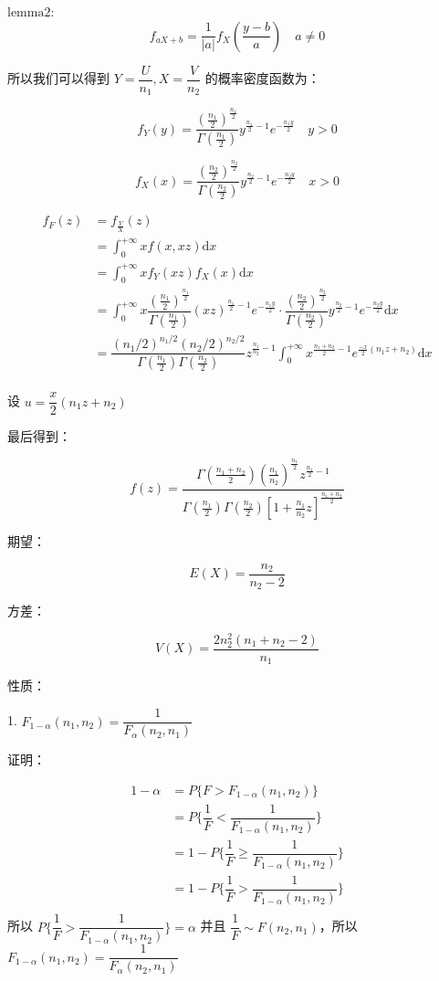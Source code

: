 \documentclass[12pt, a4paper, oneside]{ctexbook}
\begin{document}
$\text{lemma2}:$
$$
f_{aX + b} = \dfrac{1}{|a|}f_X(\dfrac{y - b}{a}) \quad a \neq 0
$$

所以我们可以得到 $Y = \dfrac{U}{n_1}, X = \dfrac{V}{n_2}$ 的概率密度函数为：

$$
f_Y(y) = \dfrac{(\frac{n_1}{2})^{\frac{n_1}{2}}}{\Gamma(\frac{n_1}{2})}y^{\frac{n_1}{2} - 1}e^{-\frac{n_1y}{2}} \quad y > 0
$$

$$
f_X(x) = \dfrac{(\frac{n_2}{2})^{\frac{n_2}{2}}}{\Gamma(\frac{n_2}{2})}y^{\frac{n_2}{2} - 1}e^{-\frac{n_2y}{2}} \quad x > 0
$$

$$
\begin{aligned}
f_F(z) &= f_{\frac{Y}{X}}(z) \\
&= \int_0^{+\infty} xf(x, xz) \mathrm{d}x \\
&= \int_0^{+\infty} xf_Y(xz)f_X(x) \mathrm{d}x \\
&= \int_0^{+\infty} x \dfrac{(\frac{n_1}{2})^{\frac{n_1}{2}}}{\Gamma(\frac{n_1}{2})}(xz)^{\frac{n_1}{2} - 1}e^{-\frac{n_1y}{2}} \cdot  \dfrac{(\frac{n_2}{2})^{\frac{n_2}{2}}}{\Gamma(\frac{n_2}{2})}y^{\frac{n_2}{2} - 1}e^{-\frac{n_2y}{2}} \mathrm{d}x \\
&= \dfrac{(n_1 / 2)^{n_1 / 2}(n_2 / 2)^{n_2 / 2}}{\Gamma(\frac{n_1}{2}) \Gamma(\frac{n_2}{2})}z^{\frac{n_1}{n_2} - 1}\int_0^{+\infty}x^{\frac{n_1 + n_2}{2} - 1}e^{\frac{-x}{2}(n_1z + n_2)} \mathrm{d}x \\
\end{aligned}
$$

设 $u = \dfrac{x}{2}(n_1z + n_2)$

最后得到：

$$
f(z) = \dfrac{\Gamma(\frac{n_1 + n_2}{2})(\frac{n_1}{n_2})^{\frac{n_1}{2}}z^{\frac{n_1}{2} - 1}}{\Gamma(\frac{n_1}{2})\Gamma(\frac{n_2}{2})\left[1 + \frac{n_1}{n_2}z\right]^{\frac{n_1 + n_2}{2}}}
$$

 期望：

$$
E(X) = \dfrac{n_2}{n_2 - 2}
$$

 方差：

$$
V(X) = \dfrac{2n_2^{2}(n_1+ n_2 - 2)}{n_1}
$$

 性质：

1. $F_{1 - \alpha}(n_1, n_2) = \dfrac{1}{F_{\alpha}(n_2, n_1)}$

   证明：
   
   $$
   \begin{aligned}
   1 - \alpha &= P\{F > F_{1 - \alpha}(n_1, n_2)\} \\
   &= P\{\dfrac{1}{F} < \dfrac{1}{F_{1 - \alpha}(n_1, n_2)}\} \\
   &= 1 - P\{\dfrac{1}{F} \geq \dfrac{1}{F_{1 - \alpha}(n_1, n_2)}\} \\
   &= 1 - P\{\dfrac{1}{F} > \dfrac{1}{F_{1 - \alpha}(n_1, n_2)}\} \\
   \end{aligned}
   $$
   所以 $P\{\dfrac{1}{F} > \dfrac{1}{F_{1 - \alpha}(n_1, n_2)}\} = \alpha$ 并且 $\dfrac{1}{F} \sim F(n_2, n_1)$，所以 $F_{1 - \alpha}(n_1, n_2) = \dfrac{1}{F_{\alpha}(n_2, n_1)}$
\end{document}
